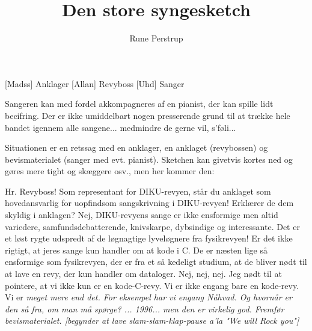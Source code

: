 \documentclass[a4paper,11pt]{article}
\title{Den store syngesketch}
\author{Rune Perstrup}
\begin{document}
\maketitle

\begin{roles}
[Madss] Anklager
[Allan] Revyboss
[Uhd] Sanger
\end{roles}

\begin{props}
\end{props}

\begin{sketch}


Sangeren kan med fordel akkompagneres af en pianist, der kan spille lidt
becifring. Der er ikke umiddelbart nogen presserende grund til at trække
hele bandet igennem alle sangene... medmindre de gerne vil, s'føli...

Situationen er en retssag med en anklager, en anklaget (revybossen) og
bevismaterialet (sanger med evt. pianist). Sketchen kan givetvis kortes ned
og gøres mere tight og skæggere osv., men her kommer den:

 Hr. Revyboss! Som representant for DIKU-revyen, står du
         anklaget som hovedansvarlig for uopfindsom
         sangskrivning i DIKU-revyen! Erklærer de dem skyldig i
         anklagen?
 Nej, DIKU-revyens sange er ikke ensformige men altid
         variedere, samfundsdebatterende, knivskarpe,
         dybsindige og interessante. Det er et løst rygte
         udspredt af de løgnagtige lyveløgnere fra fysikrevyen!
 Er det ikke rigtigt, at jeres sange kun handler om at
         kode i C. De er næsten lige så ensformige som
         fysikrevyen, der er fra et så kedeligt studium, at de
         bliver nødt til at lave en revy, der kun handler om
         dataloger.
 Nej, nej, nej. Jeg nødt til at pointere, at vi ikke kun er
         en kode-C-revy. Vi er ikke engang bare en kode-revy.
         Vi er \em{meget} mere end det. For eksempel har vi engang
 Nåhvad. Og hvornår er den så fra, om man må spørge?
 ... 1996... men den er virkelig god. Fremfør bevismaterialet.                                                                
[begynder at lave slam-slam-klap-pause a'la "We will Rock you"]


\end{sketch}
\end{document}
